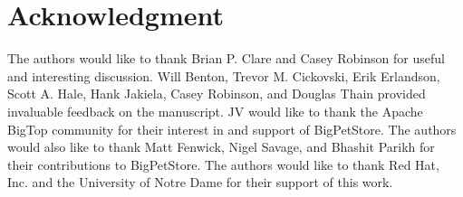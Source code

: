 \documentclass[conference]{IEEEtran}
\begin{document}
%











\section*{Acknowledgment}
The authors would like to thank Brian P. Clare and Casey Robinson for useful and interesting discussion.  Will Benton, Trevor M. Cickovski, Erik Erlandson, Scott A. Hale, Hank Jakiela, Casey Robinson, and Douglas Thain provided invaluable feedback on the manuscript.  JV would like to thank the Apache BigTop community for their interest in and support of BigPetStore.  The authors would also like to thank Matt Fenwick, Nigel Savage, and Bhashit Parikh for their contributions to BigPetStore. The authors would like to thank Red Hat, Inc. and the University of Notre Dame for their support of this work.
\end{document}

